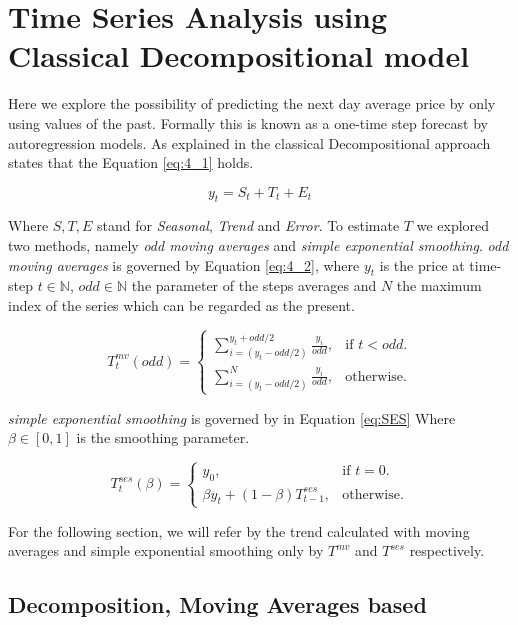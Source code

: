 \section{Time Series Analysis using Classical Decompositional model}

Here we explore the possibility of predicting the next day average price by only using values of the past. Formally this is known as a one-time step forecast
by autoregression models. As explained in \cite{makridakis2008forecasting} the classical Decompositional approach states that the Equation \ref{eq:4_1} holds.  

\begin{equation}
y_{t}=S_{t}+T_{t}+E_{t}
\label{eq:4_1}
\end{equation}

Where $S,T,E$ stand for \textit{Seasonal}, \textit{Trend} and \textit{Error}. To estimate $T$ we explored two methods, namely \emph{odd moving averages} and \emph{simple exponential smoothing}. \emph{odd moving averages} is governed by Equation \ref{eq:4_2}, where $y_{t}$ is the price at time-step $t \in \mathbb{N}$, $odd \in \mathbb{N}$ the parameter of the steps averages and $N$ the maximum index of the series which can be regarded as the present.


\begin{equation}
T^{mv}_{t}(odd)=\begin{cases}
\sum_{i=(y_{t}-odd/2)}^{y_{t}+odd/2} \frac{y_{i} }{odd} , & \text{if $t<odd$}.\\
\sum_{i=(y_{t}-odd/2)}^{N} \frac{y_{i} }{odd}, & \text{otherwise}.
\end{cases}
\label{eq:4_2}
\end{equation}

\emph{simple exponential smoothing} is governed by in Equation \ref{eq:SES} Where $\beta \in [0,1]$ is the smoothing parameter.


\begin{equation}
T^{ses}_{t}(\beta)=\begin{cases}
y_{0}  , & \text{if $t=0$}.\\
\beta y_{t}+(1-\beta)T^{ses}_{t-1}, & \text{otherwise}.
\end{cases}
\label{eq:SES}
\end{equation}

For the following section, we will refer by the trend calculated with moving averages and simple exponential smoothing only by $T^{mv}$ and $T^{ses}$ respectively.


\subsection{Decomposition, Moving Averages based}


